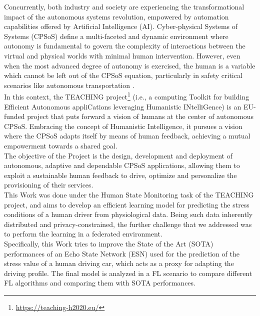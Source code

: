 
Concurrently, both industry and society are experiencing the transformational impact of the autonomous systems revolution, empowered by automation capabilities offered by Artificial Intelligence (AI). Cyber-physical Systems of Systems (CPSoS) define a multi-faceted and dynamic environment where autonomy is fundamental to govern the complexity of interactions between the virtual and physical worlds with minimal human intervention. However, even when the most advanced degree of autonomy is exercised, the human is a variable which cannot be left out of the CPSoS equation, particularly in safety critical scenarios like autonomous transportation \cite{teachingUnipi}. \\

In this context, the TEACHING project\footnote{\url{https://teaching-h2020.eu/}} (i.e., a computing Toolkit for building Efficient Autonomous appliCations leveraging Humanistic INtelliGence) is an EU-funded project that puts forward a vision of humans at the center of autonomous CPSoS. Embracing the concept of Humanistic Intelligence, it pursues a vision where the CPSoS adapts itself by means of human feedback, achieving a mutual empowerment towards a shared goal. \\

The objective of the Project is the design, development and deployment of autonomous, adaptive and dependable CPSoS applications, allowing them to exploit a sustainable human feedback to drive, optimize and personalize the provisioning of their services. \\

This Work was done under the Human State Monitoring task of the TEACHING project, and aims to develop an efficient learning model for predicting the stress conditions of a human driver from physiological data. Being such data inherently distributed and privacy-constrained, the further challenge that we addressed was to perform the learning in a federated environment. \\

Specifically, this Work tries to improve the State of the Art (SOTA) performances of an Echo State Network (ESN) used for the prediction of the stress value of a human driving car, which acts as a proxy for adapting the driving profile. The final model is analyzed in a FL scenario to compare different FL algorithms and comparing them with SOTA performances. \\

